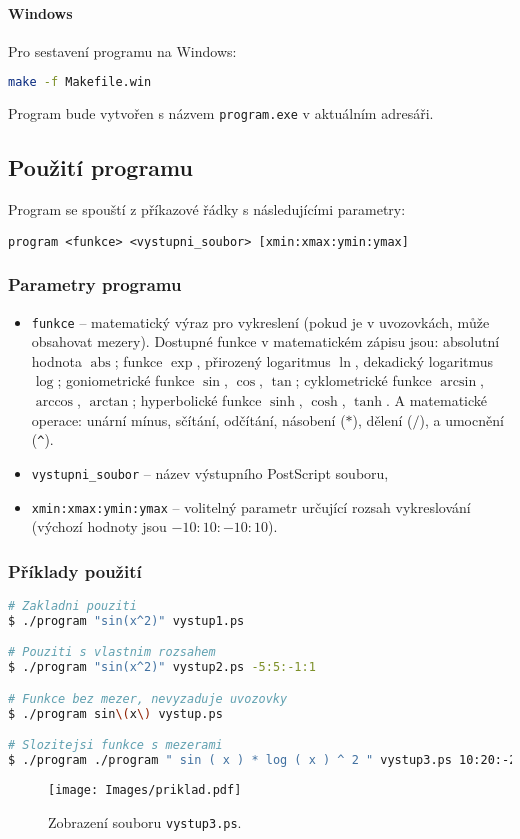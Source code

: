 \documentclass[12pt]{article} %
\begin{document}
\paragraph{Windows}
Pro sestavení programu na Windows:
\begin{lstlisting}[language=bash]
make -f Makefile.win
\end{lstlisting}
Program bude vytvořen s názvem \texttt{program.exe} v aktuálním adresáři.

\subsection{Použití programu}
Program se spouští z příkazové řádky s následujícími parametry:
\begin{lstlisting}
program <funkce> <vystupni_soubor> [xmin:xmax:ymin:ymax]
\end{lstlisting}
\subsubsection{Parametry programu}
\begin{itemize}
    \item \texttt{funkce} – matematický výraz pro vykreslení (pokud je v uvozovkách, může obsahovat mezery). Dostupné funkce v matematickém zápisu jsou: absolutní hodnota $\operatorname{abs}$; funkce $\exp$, přirozený logaritmus $\ln$, dekadický logaritmus $\log$; goniometrické funkce $\sin$, $\cos$, $\tan$; cyklometrické funkce $\arcsin$, $\arccos$, $\arctan$; hyperbolické funkce $\sinh$, $\cosh$, $\tanh$. A matematické operace: unární mínus, sčítání, odčítání, násobení ($*$), dělení ($/$), a umocnění (\texttt{\^{}}).
    \item \texttt{vystupni\_soubor} – název výstupního PostScript souboru,
    \item \texttt{xmin:xmax:ymin:ymax} – volitelný parametr určující rozsah vykreslování (výchozí hodnoty jsou $-10:10:-10:10$).
\end{itemize}


\subsubsection{Příklady použití}
\begin{lstlisting}[language=bash, caption=Příklady použití]
# Zakladni pouziti
$ ./program "sin(x^2)" vystup1.ps

# Pouziti s vlastnim rozsahem
$ ./program "sin(x^2)" vystup2.ps -5:5:-1:1

# Funkce bez mezer, nevyzaduje uvozovky
$ ./program sin\(x\) vystup.ps

# Slozitejsi funkce s mezerami
$ ./program ./program " sin ( x ) * log ( x ) ^ 2 " vystup3.ps 10:20:-2:2
\end{lstlisting}
\begin{figure}[H]
    \centering
    \texttt{[image: Images/priklad.pdf]} %
    \caption{Zobrazení souboru \texttt{vystup3.ps}.}
    \label{fig:example-graph}
\end{figure}
\end{document}
